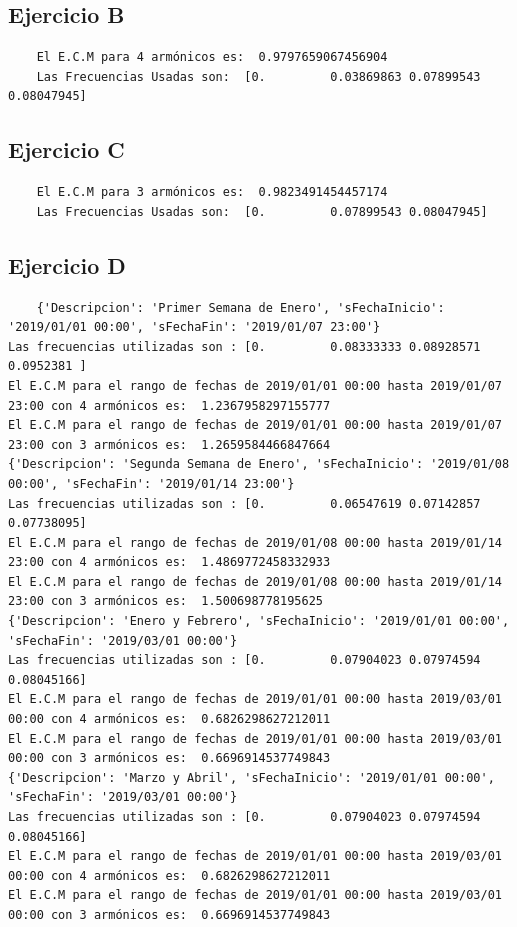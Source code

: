\documentclass[10pt,a4paper]{article}
\numberwithin{equation}{section}
\numberwithin{figure}{section}
\numberwithin{table}{section}
\begin{document}
\subsection{Ejercicio B}
\begin{verbatim}
    El E.C.M para 4 armónicos es:  0.9797659067456904
    Las Frecuencias Usadas son:  [0.         0.03869863 0.07899543 0.08047945]
\end{verbatim}
\subsection{Ejercicio C}
\begin{verbatim}
    El E.C.M para 3 armónicos es:  0.9823491454457174
    Las Frecuencias Usadas son:  [0.         0.07899543 0.08047945]
\end{verbatim}
\subsection{Ejercicio D}
\begin{verbatim}
    {'Descripcion': 'Primer Semana de Enero', 'sFechaInicio': '2019/01/01 00:00', 'sFechaFin': '2019/01/07 23:00'}
Las frecuencias utilizadas son : [0.         0.08333333 0.08928571 0.0952381 ]
El E.C.M para el rango de fechas de 2019/01/01 00:00 hasta 2019/01/07 23:00 con 4 armónicos es:  1.2367958297155777
El E.C.M para el rango de fechas de 2019/01/01 00:00 hasta 2019/01/07 23:00 con 3 armónicos es:  1.2659584466847664
{'Descripcion': 'Segunda Semana de Enero', 'sFechaInicio': '2019/01/08 00:00', 'sFechaFin': '2019/01/14 23:00'}
Las frecuencias utilizadas son : [0.         0.06547619 0.07142857 0.07738095]
El E.C.M para el rango de fechas de 2019/01/08 00:00 hasta 2019/01/14 23:00 con 4 armónicos es:  1.4869772458332933
El E.C.M para el rango de fechas de 2019/01/08 00:00 hasta 2019/01/14 23:00 con 3 armónicos es:  1.500698778195625
{'Descripcion': 'Enero y Febrero', 'sFechaInicio': '2019/01/01 00:00', 'sFechaFin': '2019/03/01 00:00'}
Las frecuencias utilizadas son : [0.         0.07904023 0.07974594 0.08045166]
El E.C.M para el rango de fechas de 2019/01/01 00:00 hasta 2019/03/01 00:00 con 4 armónicos es:  0.6826298627212011
El E.C.M para el rango de fechas de 2019/01/01 00:00 hasta 2019/03/01 00:00 con 3 armónicos es:  0.6696914537749843
{'Descripcion': 'Marzo y Abril', 'sFechaInicio': '2019/01/01 00:00', 'sFechaFin': '2019/03/01 00:00'}
Las frecuencias utilizadas son : [0.         0.07904023 0.07974594 0.08045166]
El E.C.M para el rango de fechas de 2019/01/01 00:00 hasta 2019/03/01 00:00 con 4 armónicos es:  0.6826298627212011
El E.C.M para el rango de fechas de 2019/01/01 00:00 hasta 2019/03/01 00:00 con 3 armónicos es:  0.6696914537749843
\end{verbatim}
\end{document}
